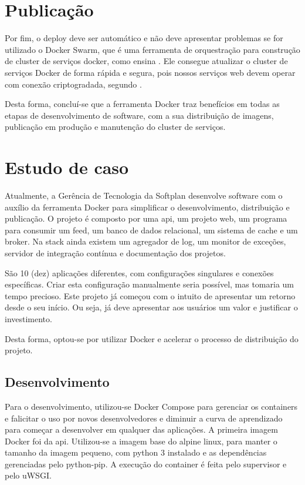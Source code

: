 \documentclass[
	12pt,				%
	openright,			%
	oneside,			%
	a4paper,			%
	chapter=TITLE,		%
	section=TITLE,		%
	english,			%
	french,				%
	spanish,			%
	brazil				%
	]{abntex2}
\begin{document}
\section{Publicação}

Por fim, o deploy deve ser automático e não deve apresentar problemas se for utilizado o Docker Swarm, que é uma ferramenta de orquestração para construção de cluster de serviços docker, como ensina . Ele consegue atualizar o cluster de serviços Docker de forma rápida e segura, pois nossos serviços web devem operar com conexão criptogradada, segundo .

Desta forma, concluí-se que a ferramenta Docker traz benefícios em todas as etapas de desenvolvimento de software, com a sua distribuição de imagens, publicação em produção e manutenção do cluster de serviços.

\section{Estudo de caso}

Atualmente, a Gerência de Tecnologia da Softplan desenvolve software com o auxílio da ferramenta Docker para simplificar o desenvolvimento, distribuição e publicação. O projeto é composto por uma api, um projeto web, um programa para consumir um feed, um banco de dados relacional, um sistema de cache e um broker. Na stack ainda existem um agregador de log, um monitor de exceções, servidor de integração contínua e documentação dos projetos. 

São 10 (dez) aplicações diferentes, com configurações singulares e conexões específicas. Criar esta configuração manualmente seria possível, mas tomaria um tempo precioso. Este projeto já começou com o intuito de apresentar um retorno desde o seu início. Ou seja, já deve apresentar aos usuários um valor e justificar o investimento.

Desta forma, optou-se por utilizar Docker e acelerar o processo de distribuição do projeto.

\subsection{Desenvolvimento}

Para o desenvolvimento, utilizou-se Docker Compose para gerenciar os containers e falicitar o uso por novos desenvolvedores e diminuir a curva de aprendizado para começar a desenvolver em qualquer das aplicações. A primeira imagem Docker foi da api. Utilizou-se a imagem base do alpine linux, para manter o tamanho da imagem pequeno, com python 3 instalado e as dependências gerenciadas pelo python-pip. A execução do container é feita pelo supervisor e pelo uWSGI.
\end{document}
